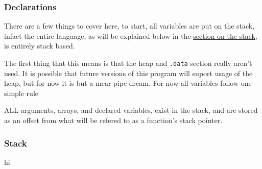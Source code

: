\documentclass{article}
\begin{document}
\subsubsection{Declarations} \label{declarations}
There are a few things to cover here, to start, all variables are put on the stack, infact the entire language, as will be explained below in the \hyperref[stack]{section on the stack}, is entirely stack based.

The first thing that this means is that the heap and \texttt{.data} section really aren't used. It is possible that future versions of this program will suport usage of the heap, but for now it is but a mear pipe dream. For now all variables follow one simple rule

ALL arguments, arrays, and declared variables, exist in the stack, and are stored as an offset from what will be refered to as a function's stack pointer.

\subsubsection{Stack}\label{stack}
hi
\end{document}
